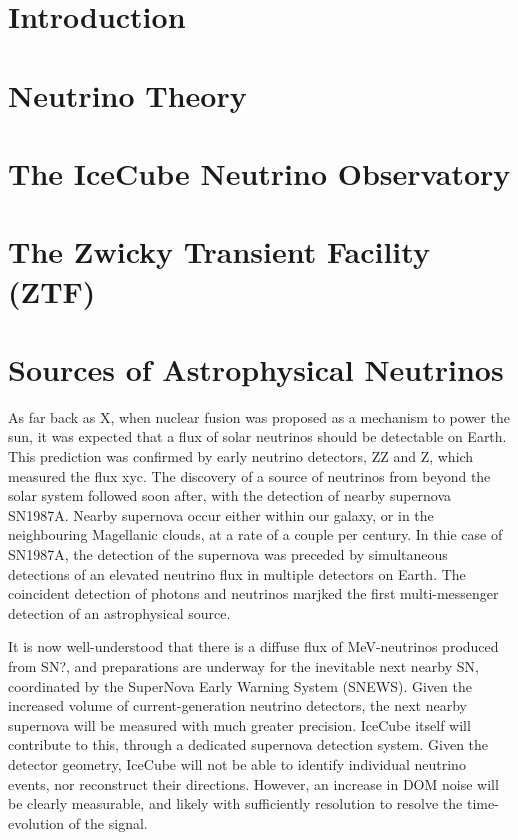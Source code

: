 \documentclass[]{article}
\begin{document}
\section{Introduction}
\section{Neutrino Theory}
\section{The IceCube Neutrino Observatory}
\section{The Zwicky Transient Facility (ZTF)}
\section{Sources of Astrophysical Neutrinos}
As far back as X, when nuclear fusion was proposed as a mechanism to power the sun, it was expected that a flux of solar neutrinos should be detectable on Earth. This prediction was confirmed by early neutrino detectors, ZZ and Z, which measured the flux xyc.
The discovery of a source of neutrinos from beyond the solar system followed soon after, with the detection of nearby supernova SN1987A. Nearby supernova occur either within our galaxy, or in the neighbouring Magellanic clouds, at a rate of a couple per century. In thie case of SN1987A, the detection of the supernova was preceded by simultaneous detections of an elevated neutrino flux in multiple detectors on Earth. The coincident detection of photons and neutrinos marjked the first multi-messenger detection of an astrophysical source.

It is now well-understood that there is a diffuse flux of MeV-neutrinos produced from SN?, and preparations are underway for the inevitable next nearby SN, coordinated by the SuperNova Early Warning System (SNEWS). Given the increased volume of current-generation neutrino detectors, the next nearby supernova will be measured with much greater precision. IceCube itself will contribute to this, through a dedicated supernova detection system. Given the detector geometry, IceCube will not be able to identify individual neutrino events, nor reconstruct their directions. However, an increase in DOM noise will be clearly measurable, and likely with sufficiently resolution to resolve the time-evolution of the signal. 
\end{document}
